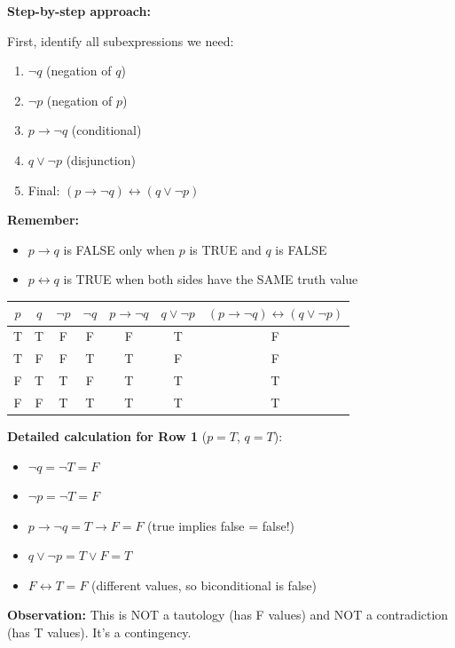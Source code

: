 \documentclass[11pt,a4paper]{article}
\begin{document}
\begin{solnbox}
\textbf{Step-by-step approach:}

First, identify all subexpressions we need:
\begin{enumerate}[noitemsep]
    \item $\neg q$ (negation of $q$)
    \item $\neg p$ (negation of $p$)
    \item $p \to \neg q$ (conditional)
    \item $q \lor \neg p$ (disjunction)
    \item Final: $(p \to \neg q) \leftrightarrow (q \lor \neg p)$
\end{enumerate}

\textbf{Remember:}
\begin{itemize}[noitemsep]
    \item $p \to q$ is FALSE only when $p$ is TRUE and $q$ is FALSE
    \item $p \leftrightarrow q$ is TRUE when both sides have the SAME truth value
\end{itemize}

\begin{center}
\begin{tabular}{cc|cc|cc|c}
\toprule
$p$ & $q$ & $\neg p$ & $\neg q$ & $p \to \neg q$ & $q \lor \neg p$ & $(p \to \neg q) \leftrightarrow (q \lor \neg p)$ \\
\midrule
T & T & F & F & F & T & F \\
T & F & F & T & T & F & F \\
F & T & T & F & T & T & T \\
F & F & T & T & T & T & T \\
\bottomrule
\end{tabular}
\end{center}

\textbf{Detailed calculation for Row 1} ($p=T$, $q=T$):
\begin{itemize}[noitemsep]
    \item $\neg q = \neg T = F$
    \item $\neg p = \neg T = F$
    \item $p \to \neg q = T \to F = F$ (true implies false = false!)
    \item $q \lor \neg p = T \lor F = T$
    \item $F \leftrightarrow T = F$ (different values, so biconditional is false)
\end{itemize}

\textbf{Observation:} This is NOT a tautology (has F values) and NOT a contradiction (has T values). It's a contingency.
\end{solnbox}
\end{document}
